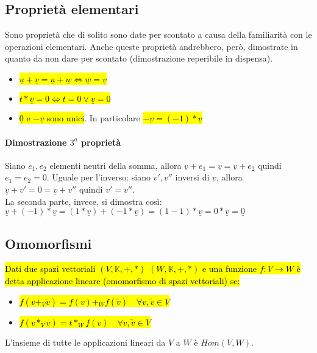 \subsection{Proprietà elementari}
Sono proprietà che di solito sono date per scontato a causa della familiarità
con le operazioni elementari. Anche queste proprietà andrebbero, però, dimostrate
in quanto da non dare per scontato (dimostrazione reperibile in dispensa).

\begin{itemize}
    \item \hl{$\underline{u} + \underline{v} = \underline{u} + \underline{w} \iff \underline{w} = \underline{v}$}
    \item \hl{$t * \underline{v} = 0 \iff t = 0 \vee \underline{v} = 0$}
    \item \hl{$\underline{0}$ e $-\underline{v}$ sono unici}. In particolare
        \hl{$-\underline{v} = (-1)*\underline{v}$}
\end{itemize}

\paragraph{Dimostrazione $3^a$ proprietà} Siano $e_1, e_2$ elementi neutri della
somma, allora $\underline{v} + e_1 = \underline{v} = \underline{v} + e_2$ quindi
$e_1 = e_2 = 0$. Uguale per l'inverso: siano $v', v''$ inversi di $\underline{v}$,
allora $\underline{v} + v' = 0 = \underline{v} + v''$ quindi $v' = v''$. \\
La seconda parte, invece, si dimostra così:
$\underline{v} + (-1)*\underline{v} = (1*\underline{v}) + (-1*\underline{v}) = (1-1)*\underline{v} = 0 * \underline{v} = \underline{0}$

\subsection{Omomorfismi}
\hl{ Dati due spazi vettoriali $(V, \mathbb{K}, +, *)$ $(W, \mathbb{K}, +, *)$ e
una funzione $f: V \to W$ è detta applicazione lineare (omomorfismo di spazi
vettoriali) se:}
\begin{itemize}
    \item \hl{$f(v +_V \tilde{v}) = f(v) +_W f(\tilde{v}) \quad \forall v, \tilde{v} \in V$}
    \item \hl{$f(v *_V v) = t *_W f(v) \quad \forall v, \tilde{v} \in V$}
\end{itemize}

L'insieme di tutte le applicazioni lineari da $V$ a $W$ è $Hom(V, W)$.

